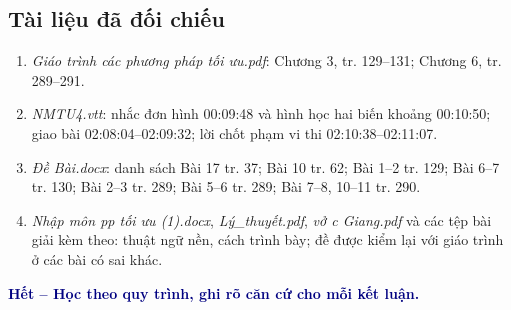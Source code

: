 \documentclass[11pt,a4paper]{article}
\begin{document}
\subsection*{Tài liệu đã đối chiếu}
\begin{enumerate}
\item \textit{Giáo trình các phương pháp tối ưu.pdf}: Chương 3, tr. 129--131; Chương 6, tr. 289--291.
\item \textit{NMTU4.vtt}: nhắc đơn hình 00:09:48 và hình học hai biến khoảng 00:10:50; giao bài 02:08:04--02:09:32; lời chốt phạm vi thi 02:10:38--02:11:07.
\item \textit{Đề Bài.docx}: danh sách Bài 17 tr. 37; Bài 10 tr. 62; Bài 1--2 tr. 129; Bài 6--7 tr. 130; Bài 2--3 tr. 289; Bài 5--6 tr. 289; Bài 7--8, 10--11 tr. 290.
\item \textit{Nhập môn pp tối ưu (1).docx}, \textit{Lý\_thuyết.pdf}, \textit{vở c Giang.pdf} và các tệp bài giải kèm theo: thuật ngữ nền, cách trình bày; đề được kiểm lại với giáo trình ở các bài có sai khác.
\end{enumerate}
\endgroup

\vfill
\begin{center}
\textcolor{navy}{\textbf{Hết -- Học theo quy trình, ghi rõ căn cứ cho mỗi kết luận.}}
\end{center}
\end{document}
